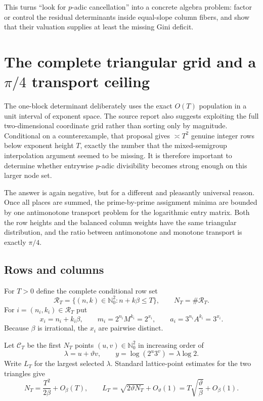 \documentclass[11pt,oneside]{article}
\theoremstyle{definition}
\theoremstyle{remark}
\newcommand{\Nzero}{\mathbb N_0}
\begin{document}
This turns ``look for $p$-adic cancellation'' into a concrete algebra problem: factor or
control the residual determinants inside equal-slope column fibers, and show that their
valuation supplies at least the missing Gini deficit.


\section{The complete triangular grid and a \texorpdfstring{$\pi/4$}{pi/4} transport ceiling}
\label{sec:fullgrid}

The one-block determinant deliberately uses the exact $O(T)$ population in a unit interval of
exponent space.  The source report also suggests exploiting the full two-dimensional
coordinate grid rather than sorting only by magnitude.  Conditional on a counterexample, that
proposal gives $\asymp T^2$ genuine integer rows below exponent height $T$, exactly the number
that the mixed-semigroup interpolation argument seemed to be missing.  It is therefore
important to determine whether entrywise $p$-adic divisibility becomes strong enough on this
larger node set.

The answer is again negative, but for a different and pleasantly universal reason.  Once all
places are summed, the prime-by-prime assignment minima are bounded by one antimonotone
transport problem for the logarithmic entry matrix.  Both the row heights and the balanced
column weights have the same triangular distribution, and the ratio between antimonotone and
monotone transport is exactly $\pi/4$.

\subsection{Rows and columns}

For $T>0$ define the complete conditional row set
\begin{equation}\label{eq:grid-rows}
 \mathcal R_T=
 \{(n,k)\in\Nzero^2:n+k\beta\le T\},
 \qquad N_T=\#\mathcal R_T.
\end{equation}
For $i=(n_i,k_i)\in\mathcal R_T$ put
\begin{equation}\label{eq:grid-row-values}
 x_i=n_i+k_i\beta,
 \qquad m_i=2^{n_i}M^{k_i}=2^{x_i},
 \qquad a_i=3^{n_i}A^{k_i}=3^{x_i}.
\end{equation}
Because $\beta$ is irrational, the $x_i$ are pairwise distinct.

Let $\mathcal C_T$ be the first $N_T$ points $(u,v)\in\Nzero^2$ in increasing order of
\[
 \lambda=u+\vartheta v,
 \qquad
 y=\log(2^u3^v)=\lambda\log2.
\]
Write $L_T$ for the largest selected $\lambda$.  Standard lattice-point estimates for the two
triangles give
\begin{equation}\label{eq:grid-cardinality}
 N_T=\frac{T^2}{2\beta}+O_\beta(T),
 \qquad
 L_T=\sqrt{2\vartheta N_T}+O_\vartheta(1)
      =T\sqrt{\frac{\vartheta}{\beta}}+O_\beta(1).
\end{equation}
\end{document}
